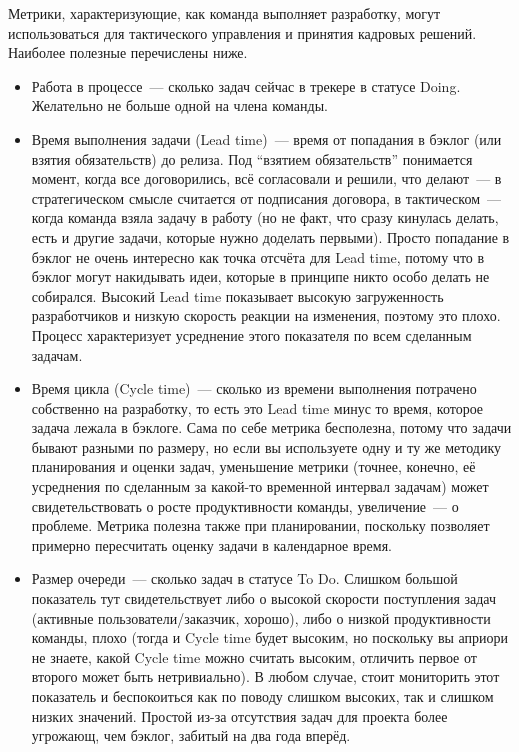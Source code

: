 \documentclass{../../text-style}
\begin{document}
Метрики, характеризующие, как команда выполняет разработку, могут использоваться для тактического управления и принятия кадровых решений. Наиболее полезные перечислены ниже.

\begin{itemize}
    \item Работа в процессе~--- сколько задач сейчас в трекере в статусе Doing. Желательно не больше одной на члена команды.
    \item Время выполнения задачи (Lead time)~--- время от попадания в бэклог (или взятия обязательств) до релиза. Под \enquote{взятием обязательств} понимается момент, когда все договорились, всё согласовали и решили, что делают~--- в стратегическом смысле считается от подписания договора, в тактическом~--- когда команда взяла задачу в работу (но не факт, что сразу кинулась делать, есть и другие задачи, которые нужно доделать первыми). Просто попадание в бэклог не очень интересно как точка отсчёта для Lead time, потому что в бэклог могут накидывать идеи, которые в принципе никто особо делать не собирался. Высокий Lead time показывает высокую загруженность разработчиков и низкую скорость реакции на изменения, поэтому это плохо. Процесс характеризует усреднение этого показателя по всем сделанным задачам.
    \item Время цикла (Cycle time)~--- сколько из времени выполнения потрачено собственно на разработку, то есть это Lead time минус то время, которое задача лежала в бэклоге. Сама по себе метрика бесполезна, потому что задачи бывают разными по размеру, но если вы используете одну и ту же методику планирования и оценки задач, уменьшение метрики (точнее, конечно, её усреднения по сделанным за какой-то временной интервал задачам) может свидетельствовать о росте продуктивности команды, увеличение~--- о проблеме. Метрика полезна также при планировании, поскольку позволяет примерно пересчитать оценку задачи в календарное время.
    \item Размер очереди~--- сколько задач в статусе To Do. Слишком большой показатель тут свидетельствует либо о высокой скорости поступления задач (активные пользователи/заказчик, хорошо), либо о низкой продуктивности команды, плохо (тогда и Cycle time будет высоким, но поскольку вы априори не знаете, какой Cycle time можно считать высоким, отличить первое от второго может быть нетривиально). В любом случае, стоит мониторить этот показатель и беспокоиться как по поводу слишком высоких, так и слишком низких значений. Простой из-за отсутствия задач для проекта более угрожающ, чем бэклог, забитый на два года вперёд.

\end{itemize}
\end{document}
